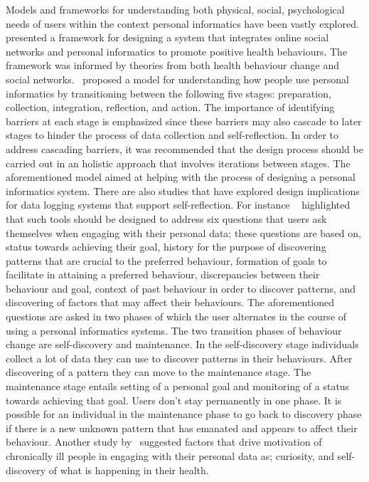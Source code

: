 Models and frameworks for understanding both physical, social, psychological needs of users within the context personal informatics have been vastly explored.~\cite{kamal2010understanding} presented a framework for designing a system that integrates online social networks and personal informatics to promote positive health behaviours. The framework was informed by theories from both health behaviour change and social networks.~\cite{li2010stage} proposed a model for understanding how people use personal informatics by transitioning between the following five stages: preparation, collection, integration, reflection, and action. The importance of identifying barriers at each stage is emphasized since these barriers may also cascade to later stages to hinder the process of data collection and self-reflection. In order to address cascading barriers, it was recommended that the design process should be carried out in an holistic approach that involves iterations between stages. The aforementioned model aimed at helping with the process of designing a personal informatics system. There are also studies that have explored design implications for data logging systems that support self-reflection. For instance ~\cite{li2011understanding} highlighted that such tools should be designed to address six questions that users ask themselves when engaging with their personal data; these questions are based on, status towards achieving their goal, history for the purpose of discovering patterns that are crucial to the preferred behaviour, formation of goals to facilitate in attaining a preferred behaviour, discrepancies between their behaviour and goal, context of past behaviour in order to discover patterns, and discovering of factors that may affect their behaviours. The aforementioned questions are asked in two phases of which the user alternates in the course of using a personal informatics systems. The two transition phases of behaviour change are self-discovery and maintenance. In the self-discovery stage individuals collect a lot of data they can use to discover patterns in their behaviours. After discovering of a pattern they can move to the maintenance stage. The maintenance stage entails setting of a personal goal and monitoring of a status towards achieving that goal. Users don't stay permanently in one phase. It is possible for an individual in the maintenance phase to go back to discovery phase if there is a new unknown pattern that has emanated and appears to affect their behaviour. Another study by~\cite{macleod2013personal} suggested factors that drive motivation of chronically ill people in engaging with their personal data as; curiosity, and self-discovery of what is happening in their health.

